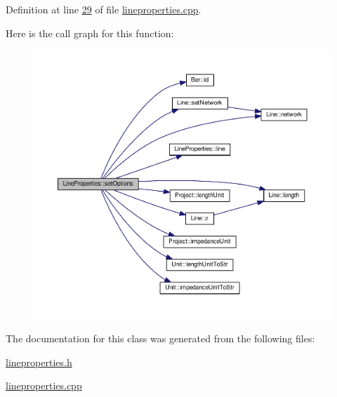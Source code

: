 Definition at line \hyperlink{lineproperties_8cpp_source_l00029}{29} of file \hyperlink{lineproperties_8cpp_source}{lineproperties.\+cpp}.



Here is the call graph for this function\+:
\nopagebreak
\begin{figure}[H]
\begin{center}
\leavevmode
\includegraphics[width=350pt]{class_line_properties_ac14e88843b60ac7130a11c057306379a_cgraph}
\end{center}
\end{figure}




The documentation for this class was generated from the following files\+:\begin{DoxyCompactItemize}
\item 
\hyperlink{lineproperties_8h}{lineproperties.\+h}\item 
\hyperlink{lineproperties_8cpp}{lineproperties.\+cpp}\end{DoxyCompactItemize}
